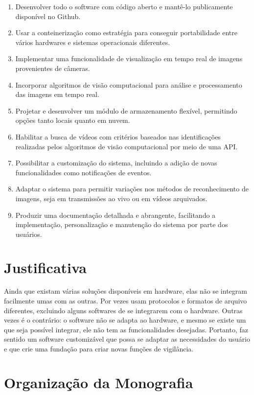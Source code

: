 \documentclass[12pt, %
openright, 
oneside, %
a4paper,    %
brazil]{facom-ufu-abntex2}
\begin{document}
\begin{enumerate}
	\item Desenvolver todo o software com código aberto e mantê-lo
	      publicamente disponível no Github.
	\item Usar a conteinerização como estratégia para conseguir
	      portabilidade entre vários hardwares e sistemas operacionais diferentes.
	\item Implementar uma funcionalidade de visualização em tempo real de
	      imagens provenientes de câmeras.
	\item Incorporar algoritmos de visão computacional para análise e
	      processamento das imagens em tempo real.
	\item Projetar e desenvolver um módulo de armazenamento flexível,
	      permitindo opções tanto locais quanto em nuvem.
	\item Habilitar a busca de vídeos com critérios baseados nas
	      identificações realizadas pelos algoritmos de visão computacional por meio de
	      uma API.
	\item Possibilitar a customização do sistema, incluindo a adição de
	      novas funcionalidades como notificações de eventos.
	\item Adaptar o sistema para permitir variações nos métodos de
	      reconhecimento de imagens, seja em transmissões ao vivo ou em vídeos
	      arquivados.
	\item Produzir uma documentação detalhada e abrangente, facilitando a
	      implementação, personalização e manutenção do sistema por parte dos usuários.
\end{enumerate}

\section{Justificativa}

Ainda que existam várias soluções disponíveis em hardware, elas não se integram
facilmente umas com as outras. Por vezes usam protocolos e formatos de arquivo
diferentes, excluindo alguns softwares de se integrarem com o hardware. Outras
vezes é o contrário: o software não se adapta ao hardware, e mesmo se existe um
que seja possível integrar, ele não tem as funcionalidades desejadas. Portanto,
faz sentido um software customizável que possa se adaptar as necessidades do
usuário e que crie uma fundação para criar novas funções de vigilância.

\section{Organização da Monografia}
\end{document}
